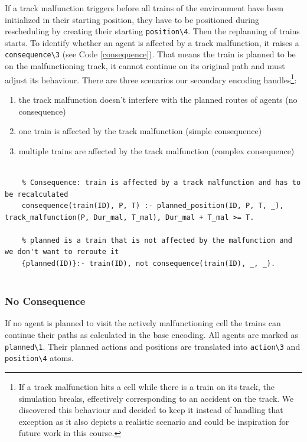 \documentclass[runningheads]{llncs}
\begin{document}
If a track malfunction triggers before all trains of the environment have been initialized in their starting position, they have to be positioned during rescheduling by creating their starting \verb|position\4|. Then the replanning of trains starts. To identify whether an agent is affected by a track malfunction, it raises a \verb|consequence\3| (see Code \ref{consequence}). That means the train is planned to be on the malfunctioning track, it cannot continue on its original path and must adjust its behaviour. There are three scenarios our secondary encoding handles\footnote{If a track malfunction hits a cell while there is a train on its track, the simulation breaks, effectively corresponding to an accident on the track. We discovered this behaviour and decided to keep it instead of handling that exception as it also depicts a realistic scenario and could be inspiration for future work in this course.}: 
\renewcommand{\labelenumi}{\alph{enumi})}
\begin{enumerate}
	\item the track malfunction doesn't interfere with the planned routes of agents (no consequence)
	\item one train is affected by the track malfunction (simple consequence)
	\item multiple trains are affected by the track malfunction (complex consequence)
\end{enumerate} 


\begin{lstlisting}[style=mystyle, language=Clingo, caption={Definition of consequence: if a train is attempting to go into a malfunctioning cell it raises a consequence.}, label={consequence}]
	
	% Consequence: train is affected by a track malfunction and has to be recalculated
	consequence(train(ID), P, T) :- planned_position(ID, P, T, _), track_malfunction(P, Dur_mal, T_mal), Dur_mal + T_mal >= T.

	% planned is a train that is not affected by the malfunction and we don't want to reroute it
	{planned(ID)}:- train(ID), not consequence(train(ID), _, _).
	
\end{lstlisting}


\subsubsection{No Consequence}
If no agent is planned to visit the actively malfunctioning cell the trains can continue their paths as calculated in the base encoding. All agents are marked as \verb|planned\1|. Their planned actions and positions are translated into \verb|action\3| and \verb|position\4| atoms. 
\end{document}
